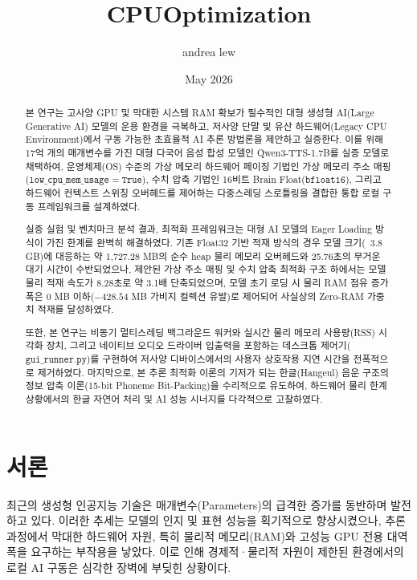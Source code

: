 \documentclass[twocolumn]{article}
\title{CPUOptimization}
\author{andrea lew}
\date{May 2026}
\begin{document}
\maketitle

\begin{abstract}
본 연구는 고사양 GPU 및 막대한 시스템 RAM 확보가 필수적인 대형 생성형 AI(Large Generative AI) 모델의 운용 환경을 극복하고, 저사양 단말 및 유산 하드웨어(Legacy CPU Environment)에서 구동 가능한 초효율적 AI 추론 방법론을 제안하고 실증한다. 이를 위해 17억 개의 매개변수를 가진 대형 다국어 음성 합성 모델인 Qwen3-TTS-1.7B를 실증 모델로 채택하여, 운영체제(OS) 수준의 가상 메모리 하드웨어 페이징 기법인 가상 메모리 주소 매핑($\mathtt{low\_cpu\_mem\_usage=True}$), 수치 압축 기법인 16비트 Brain Float($\mathtt{bfloat16}$), 그리고 하드웨어 컨텍스트 스위칭 오버헤드를 제어하는 다중스레딩 스로틀링을 결합한 통합 로컬 구동 프레임워크를 설계하였다.

실증 실험 및 벤치마크 분석 결과, 최적화 프레임워크는 대형 AI 모델의 Eager Loading 방식이 가진 한계를 완벽히 해결하였다. 기존 Float32 기반 적재 방식의 경우 모델 크기(~3.8 GB)에 대응하는 약 1,727.28 MB의 순수 heap 물리 메모리 오버헤드와 25.76초의 무거운 대기 시간이 수반되었으나, 제안된 가상 주소 매핑 및 수치 압축 최적화 구조 하에서는 모델 물리 적재 속도가 8.28초로 약 3.1배 단축되었으며, 모델 초기 로딩 시 물리 RAM 점유 증가폭은 0 MB 이하($-428.54$ MB 가비지 컬렉션 유발)로 제어되어 사실상의 Zero-RAM 가중치 적재를 달성하였다.

또한, 본 연구는 비동기 멀티스레딩 백그라운드 워커와 실시간 물리 메모리 사용량(RSS) 시각화 장치, 그리고 네이티브 오디오 드라이버 입출력을 포함하는 데스크톱 제어기($\mathtt{gui\_runner.py}$)를 구현하여 저사양 디바이스에서의 사용자 상호작용 지연 시간을 전폭적으로 제거하였다. 마지막으로, 본 추론 최적화 이론의 기저가 되는 한글(Hangeul) 음운 구조의 정보 압축 이론(15-bit Phoneme Bit-Packing)을 수리적으로 유도하여, 하드웨어 물리 한계 상황에서의 한글 자연어 처리 및 AI 성능 시너지를 다각적으로 고찰하였다.
\end{abstract}

\section{서론}
최근의 생성형 인공지능 기술은 매개변수(Parameters)의 급격한 증가를 동반하며 발전하고 있다. 이러한 추세는 모델의 인지 및 표현 성능을 획기적으로 향상시켰으나, 추론 과정에서 막대한 하드웨어 자원, 특히 물리적 메모리(RAM)와 고성능 GPU 전용 대역폭을 요구하는 부작용을 낳았다. 이로 인해 경제적·물리적 자원이 제한된 환경에서의 로컬 AI 구동은 심각한 장벽에 부딪힌 상황이다.
\end{document}
